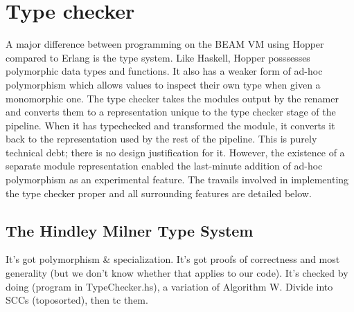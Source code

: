 \section{Type checker}

A major difference between programming on the BEAM VM using Hopper compared to Erlang is the type system. Like Haskell, Hopper posssesses polymorphic data types and functions. It also has a weaker form of ad-hoc polymorphism which allows values to inspect their own type when given a monomorphic one. 
The type checker takes the modules output by the renamer and converts them to a representation unique to the type checker stage of the pipeline. When it has typechecked and transformed the module, it converts it back to the representation used by the rest of the pipeline. This is purely technical debt; there is no design justification for it. However, the existence of a separate module representation enabled the last-minute addition of ad-hoc polymorphism as an experimental feature. The travails involved in implementing the type checker proper and all surrounding features are detailed below.

\subsection{The Hindley Milner Type System}

It's got polymorphism \& specialization. It's got proofs of correctness and most generality (but we don't know whether that applies to our code). It's checked by doing (program in TypeChecker.hs), a variation of Algorithm W.
Divide into SCCs (toposorted), then tc them.



